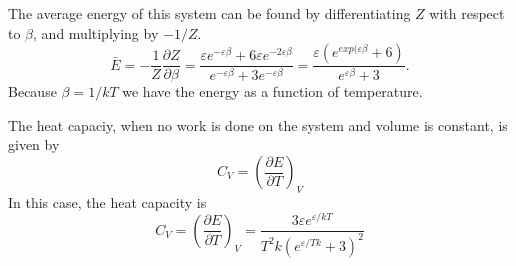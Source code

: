 \documentclass[10pt,a4paper]{amsart}
\begin{document}
The average energy of this system can be found by differentiating $Z$ with respect to $\beta$, and multiplying by $-1/Z$.
\begin{equation}
\bar{E} = -\frac{1}{Z}\frac{\partial Z}{\partial \beta}=
\frac{\varepsilon e^{-\varepsilon\beta}+6\varepsilon e^{-2\varepsilon\beta} }{e^{-\varepsilon\beta} + 3e^{-\varepsilon\beta}} = \frac{\varepsilon(e^{exp(\varepsilon\beta}+6)}{e^{\varepsilon\beta}+3}.
\end{equation}
Because $\beta = 1/kT$ we have the energy as a function of temperature.

The heat capaciy, when no work is done on the system and volume is constant, is given by
\begin{equation}
C_V = \left(\frac{\partial E}{\partial T} \right)_V
\end{equation}
In this case, the heat capacity is 
\begin{equation*}
C_V =\left(\frac{\partial E}{\partial T} \right)_V =
\frac{3\varepsilon e^{\varepsilon/kT}}{T^2k(e^{\varepsilon/Tk}+3)^2}
\end{equation*}
\end{document}
